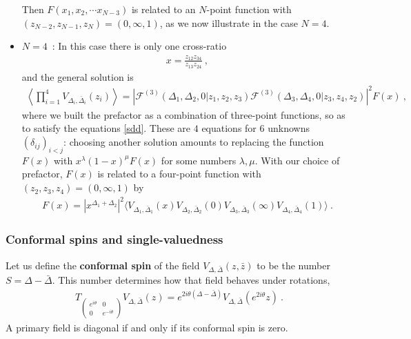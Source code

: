 \documentclass[12pt, a4paper, notitlepage, twoside]{report}
\numberwithin{equation}{section}
\theoremstyle{break}
\begin{document}
\begin{itemize}
Then $F(x_1,x_2,\cdots x_{N-3})$ is related to an $N$-point function with $(z_{N-2},z_{N-1},z_N)=(0,\infty,1)$, as we now illustrate in the case $N=4$.

\item $\boxed{N=4}$\ : In this case there is only one cross-ratio 
\begin{align}
 x=\frac{z_{12}z_{34}}{z_{13}z_{24}}\ ,
\label{xe}
\end{align}
and the general solution is 
\begin{align}
 \left\langle\prod_{i=1}^4 V_{\Delta_i,\bar\Delta_i}(z_i)\right\rangle = \left|\mathcal{F}^{(3)}(\Delta_1,\Delta_2,0|z_1,z_2,z_3) \mathcal{F}^{(3)}(\Delta_3,\Delta_4,0|z_3,z_4,z_2)\right|^2 F(x)\ ,
\label{zgg}
\end{align}
where we built the prefactor as a combination of three-point functions, so as to satisfy the equations \eqref{sdd}.
These are $4$ equations for $6$ unknowns $(\delta_{ij})_{i<j}$: choosing another solution amounts to replacing the function $F(x)$ with $x^\lambda (1-x)^\mu F(x)$ for some numbers $\lambda,\mu$.
With our choice of prefactor, $F(x)$ is related to a four-point function with $(z_2,z_3,z_4)=(0,\infty,1)$ by
\begin{align}
 F(x) =\left| x^{\Delta_1+\Delta_2} \right|^2 \Big\langle V_{\Delta_1,\bar\Delta_1}(x)V_{\Delta_2,\bar\Delta_2}(0)V_{\Delta_3,\bar\Delta_3}(\infty) V_{\Delta_4,\bar\Delta_4}(1)\Big\rangle \ .
\label{fx}
\end{align}
\end{itemize}

\subsubsection{Conformal spins and single-valuedness}

Let us define the \textbf{conformal spin} of the field $V_{\Delta,\bar\Delta}(z,\bar z)$ to be the number $S=\Delta-\bar\Delta$. This number determines how that field behaves under rotations, 
\begin{align}
 T_{\left(\begin{smallmatrix} e^{i\theta} & 0 \\ 0 & e^{-i\theta} \end{smallmatrix}\right)} V_{\Delta,\bar{\Delta}}(z) = e^{2i\theta(\Delta-\bar\Delta)} V_{\Delta,\bar{\Delta}}(e^{2i\theta} z)\ .
\end{align}
A primary field is diagonal if and only if its conformal spin is zero.
\end{document}
